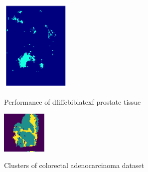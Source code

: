 \documentclass[journal=jacsat,manuscript=article]{achemso}
\begin{document}
\begin{figure}[htbp]
\begin{minipage}[c]{0.9\textwidth}
{    \includegraphics[width=0.3\textwidth]{pic/prostate/gmm_selected.png}
  } 
  \end{minipage}
  \caption{Performance of dfiffebiblatexf prostate tissue}
\end{figure}

\newpage
\newcommand{\colWidth}{0.19}
\begin{figure}[htbp]
  \centering
    \begin{minipage}[c]{0.9\textwidth}
    {
      \includegraphics[width=\colWidth\textwidth]{pic/coloractal/s25_cluster.png}
    } 
    \end{minipage}
    \caption{Clusters of colorectal adenocarcinoma dataset}
    \label{fig:Clusters of colorectal adenocarcinoma dataset}
\end{figure}
\end{document}
